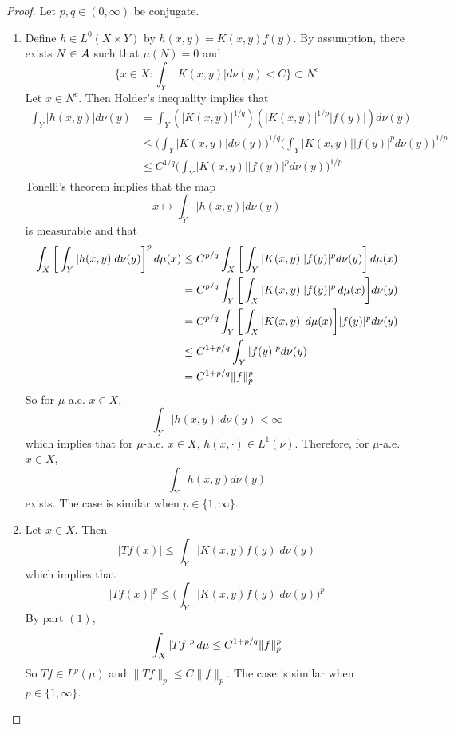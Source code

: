 \documentclass{book}
\begin{document}
	\begin{proof}Let $p,q \in (0,\infty)$ be conjugate.
	\begin{enumerate}
	\item Define $h \in L^0(X \times Y)$ by $h(x,y) = K(x, y) f(y)$. By assumption, there exists $N \in \mathcal{A}$ such that $\mu(N) = 0$ and  $$\bigg \{x \in X: \int_Y |K(x, y)| d \nu(y) < C \bigg\} \subset N^c$$ 
	Let $x \in N^c$. Then Holder's inequality implies that
	\begin{align*}
	\int_Y |h(x,y)| d\nu(y) 
	&= \int_Y (|K(x,y)|^{1/q})(|K(x,y)|^{1/p}|f(y)|) d\nu(y) \\
	& \leq \bigg( \int_Y |K(x,y)| d \nu(y) \bigg)^{1/q} \bigg( \int_Y |K(x,y)||f(y)|^p d\nu(y) \bigg)^{1/p} \\
	& \leq C^{1/q} \bigg( \int_Y |K(x,y)||f(y)|^p d\nu(y) \bigg)^{1/p}
	\end{align*}
	Tonelli's theorem implies that the map $$x \mapsto \int_Y |h(x,y)| d\nu(y) $$ is measurable and that  
	\begin{align*}
	\int_X \bigg[ \int_Y |h(x,y)| d\nu(y) \bigg]^p \, d \mu(x) 
	&\leq  C^{p/q}  \int_X \bigg[ \int_Y |K(x,y)||f(y)|^p d\nu(y) \bigg] \, d \mu(x) \\
	&= C^{p/q}  \int_Y \bigg[ \int_X |K(x,y)||f(y)|^p \, d \mu(x) \bigg] d\nu(y) \\
	&= C^{p/q}  \int_Y \bigg[ \int_X |K(x,y)| \, d \mu(x) \bigg] |f(y)|^p d\nu(y) \\
	& \leq C^{1 + p/q} \int_Y |f(y)|^p  d\nu(y) \\
	& = C^{1 + p/q} \|f\|_p^p
	\end{align*}
	So for $\mu$-a.e. $x \in X$, $$\int_Y |h(x,y)| d\nu(y) < \infty$$ which implies that for $\mu$-a.e. $x \in X$, $h(x, \cdot) \in L^1(\nu)$. Therefore, for $\mu$-a.e. $x \in X$, $$\int_Y h(x,y) d\nu(y)$$ exists. The case is similar when $p \in \{1, \infty\}$.
	\item Let $x \in X$. Then $$|Tf(x)| \leq \int_Y |K(x,y)f(y)| d \nu(y)$$ which implies that $$|Tf(x)|^p \leq \bigg( \int_Y |K(x,y)f(y)| d \nu(y) \bigg)^p$$
	By part $(1)$, $$\int_X |Tf|^p \, d \mu \leq C^{1+p/q}\|f\|_p^p$$ 
	So $Tf \in L^p(\mu)$ and $\|Tf\|_p \leq C\|f\|_p$.
	The case is similar when $p \in \{1, \infty\}$.
	\end{enumerate}
	\end{proof}
	
	
	
	
	
	
	
	
	
	
	
\end{document}
